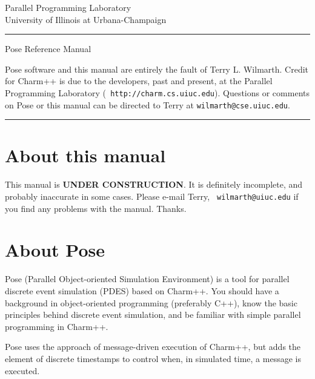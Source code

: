 \documentclass[10pt]{article}
\newcommand{\pose}{{\sc Pose}}
\begin{document}
\begin{titlepage}
 \begin{flushright}
   {\Large
     Parallel Programming Laboratory\\
     University of Illinois at Urbana-Champaign\\
   }
 \end{flushright}
 \rule{\textwidth}{3pt}
 \vspace{\fill}
 \begin{flushright}
   \textsf{\Huge \pose{} Reference Manual \\}
 \end{flushright}
 \vspace{\fill}
 {\small \pose{} software and this manual are entirely the fault of Terry
L. Wilmarth.  Credit for Charm++ is due to the developers, past and
present, at the Parallel Programming Laboratory ({\tt
http://charm.cs.uiuc.edu}).  Questions or comments on \pose{} or this
manual can be directed to Terry at {\tt wilmarth@cse.uiuc.edu}.
} \\
 \rule{\textwidth}{3pt}
\end{titlepage}

\tableofcontents
\newpage

\section{About this manual}

This manual is {\bf UNDER CONSTRUCTION}.  It is definitely incomplete,
and probably inaccurate in some cases.  Please e-mail Terry, {\tt
  wilmarth@uiuc.edu} if you find any problems with the manual.  Thanks.

\section{About \pose{}}

\pose{} (Parallel Object-oriented Simulation Environment) is a tool for
parallel discrete event simulation (PDES) based on Charm++.  You should have
a background in object-oriented programming (preferably C++), know the
basic principles behind discrete event simulation, and be familiar
with simple parallel programming in Charm++.  

\pose{} uses the approach of message-driven execution of Charm++, but
adds the element of discrete timestamps to control when, in simulated
time, a message is executed.
\end{document}
